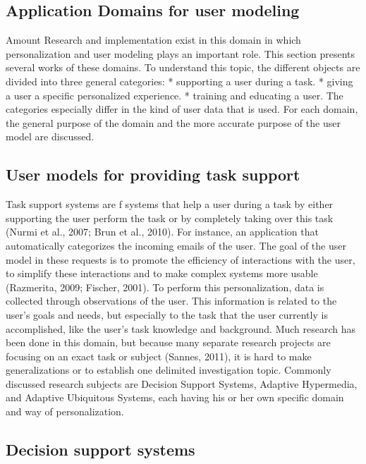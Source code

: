 \subsection{Application Domains for user modeling}

Amount Research and implementation exist in this domain in which personalization
and user modeling plays an important role. This section presents several works
of these domains. To understand this topic, the different objects are divided
into three general categories: 
* supporting a user during a task. 
* giving a user a specific personalized experience. 
* training and educating a user.  
The categories especially differ in the kind of user data that is used. For each
domain, the general purpose of the domain and the more accurate purpose of the
user model are discussed.

\subsection{User models for providing task support}

Task support systems are f systems that help a user during a task by either
supporting the user perform the task or by completely taking over this task
(Nurmi et al., 2007; Brun et al., 2010). For instance,  an application that
automatically categorizes the incoming emails of the user. The goal of the user
model in these requests is to promote the efficiency of interactions with the
user, to simplify these interactions and to make complex systems more usable
(Razmerita, 2009; Fischer,  2001). To perform this personalization, data is
collected through observations of the user. This information is related to the
user’s goals and needs, but especially to the task that the user currently is
accomplished, like the user’s task knowledge and background. Much research has
been done in this domain, but because many separate research projects are
focusing on an exact task or subject (Sannes, 2011), it is hard to make
generalizations or to establish one delimited investigation topic. Commonly
discussed research subjects are Decision Support Systems,  Adaptive Hypermedia,
and Adaptive Ubiquitous Systems, each having his or her own specific domain and
way of personalization.  

\subsection{Decision support systems}

